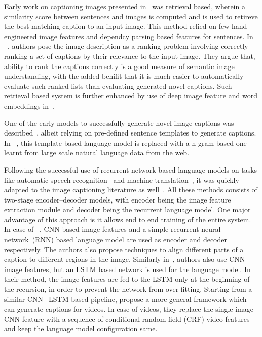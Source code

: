Early work on captioning images presented in~\cite{Farhadi2010} was retrieval
based, wherein a similarity score between sentences and images is computed and
is used to retireve the best matching caption to an input image. 
This method relied on few hand engineered image features and dependcy parsing
based features for sentences.
In ~\cite{Hodosh2013}, authors pose the image description as a ranking problem
involving correctly ranking a set of captions by their relevance to the input
image.
They argue that, ability to rank the captions correctly is a good measure of
semantic image understanding, with the added benifit that it is much easier to
automatically evaluate such ranked lists than evaluating generated novel
captions.
Such retrieval based system is further enhanced by use of deep image feature and
word embeddings in~\cite{Karpathy2014}.

One of the early models to successfully generate novel image captions was
described~\cite{kulkarni2013babytalk}, albeit relying on pre-defined sentence
templates to generate captions.
In ~\cite{Li2011}, this template based language model is replaced with a n-gram
based one learnt from large scale natural language data from the web.

Following the successful use of recurrent network based language models on
tasks like automatic speech recognition~\cite{mikolov2010recurrent} and machine
translation~\cite{bahdanau2014neural}, it was quickly adapted to the image
captioning literature as well~\cite{Karpathy_2015_CVPR, Vinyals_2015_CVPR,
donahue2015long}.
All these methods consists of two-stage encoder--decoder models, with 
encoder being the image feature extraction module and decoder being the
recurrent language model.
One major advantage of this approach is it allows end to end training of the
entire system.
In case of ~\cite{Karpathy_2015_CVPR}, CNN based image features and a simple
recurrent neural network~(RNN) based language model are used as encoder and
decoder respectively.
The authors also propose techniques to align different parts of a caption to
different regions in the image. 
Similarly in~\cite{Vinyals_2015_CVPR}, authors also use CNN image features, but
an LSTM based network is used for the language model.
In their method, the image features are fed to the LSTM only at the beginning of
the recursion, in order to prevent the network from over-fitting.
Starting from a similar CNN+LSTM based pipeline,\cite{donahue2015long} propose a
more general framework which can generate captions for videos.
In case of videos, they replace the single image CNN feature with a sequence of
conditional random field (CRF) video features and keep the language model
configuration same.

